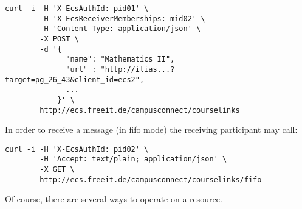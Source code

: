 \begin{verbatim}   
curl -i -H 'X-EcsAuthId: pid01' \
        -H 'X-EcsReceiverMemberships: mid02' \
        -H 'Content-Type: application/json' \
        -X POST \      
        -d '{           
              "name": "Mathematics II",
              "url" : "http://ilias...?target=pg_26_43&client_id=ecs2",
              ...          
            }' \            
        http://ecs.freeit.de/campusconnect/courselinks
\end{verbatim}              
In order to receive a message (in fifo mode) the receiving
participant may call:       
\begin{verbatim}            
curl -i -H 'X-EcsAuthId: pid02' \
        -H 'Accept: text/plain; application/json' \
        -X GET \             
        http://ecs.freeit.de/campusconnect/courselinks/fifo
\end{verbatim}                 
                                
Of course, there are several ways  to operate on a resource. 
